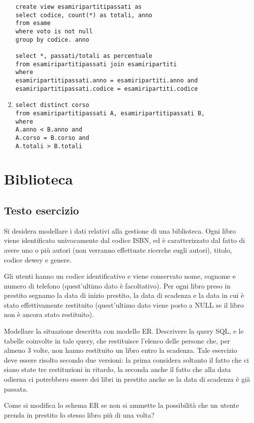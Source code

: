 \documentclass[11pt]{article}
\begin{document}
\begin{enumerate}
\begin{verbatim}
create view esamiripartitipassati as
select codice, count(*) as totali, anno
from esame
where voto is not null
group by codice. anno

select *, passati/totali as percentuale
from esamiripartitipassati join esamiripartiti
where
esamiripartitipassati.anno = esamiripartiti.anno and
esamiripartitipassati.codice = esamiripartiti.codice
\end{verbatim}
\item
\begin{verbatim}
select distinct corso
from esamiripartitipassati A, esamiripartitipassati B,
where
A.anno < B.anno and
A.corso = B.corso and
A.totali > B.totali
\end{verbatim}
\end{enumerate}


\section{Biblioteca}

\subsection{Testo esercizio}

Si desidera modellare i dati relativi alla gestione di una biblioteca. Ogni libro viene
identificato univocamente dal codice ISBN, ed \`e caratterizzato dal fatto di avere uno o
pi\`u autori (non verranno effettuate ricerche sugli autori), titolo, codice dewey e genere.

Gli utenti hanno un codice identificativo e viene conservato nome, cognome e numero di
telefono (quest'ultimo dato \`e facoltativo). Per ogni libro preso in prestito
segnamo la data di inizio prestito, la data di scadenza e la data in cui \`e
stato effettivamente restituito (quest'ultimo dato viene posto a NULL se il libro non \`e
ancora stato restituito).

Modellare la situazione descritta con modello ER. Descrivere la query SQL, e le tabelle
coinvolte in tale query, che restituisce l'elenco delle persone che, per almeno 3 volte,
non hanno restituito un libro entro la scadenza. Tale esercizio deve essere
risolto secondo due versioni: la prima considera soltanto il fatto che ci siano
state tre restituzioni in ritardo, la seconda anche il fatto che alla data
odierna ci potrebbero essere dei libri in prestito anche se la data di scadenza
\`e gi\`a passata.


Come si modifica lo schema ER
se non si ammette la possibilit\`a che un utente prenda in prestito lo stesso
libro pi\`u di una volta?
\end{document}
